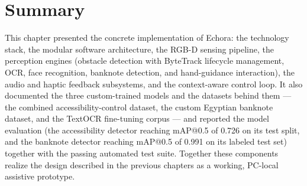 \section{Summary}

This chapter presented the concrete implementation of Echora: the technology stack, the modular software architecture, the RGB-D sensing pipeline, the perception engines (obstacle detection with ByteTrack lifecycle management, OCR, face recognition, banknote detection, and hand-guidance interaction), the audio and haptic feedback subsystems, and the context-aware control loop. It also documented the three custom-trained models and the datasets behind them --- the combined accessibility-control dataset, the custom Egyptian banknote dataset, and the TextOCR fine-tuning corpus --- and reported the model evaluation (the accessibility detector reaching mAP@0.5 of 0.726 on its test split, and the banknote detector reaching mAP@0.5 of 0.991 on its labeled test set) together with the passing automated test suite. Together these components realize the design described in the previous chapters as a working, PC-local assistive prototype.
